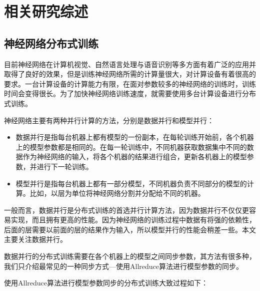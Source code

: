 \chapter{相关研究综述}
\label{chap2}

\section{神经网络分布式训练}
目前神经网络在计算机视觉、自然语言处理与语音识别等多方面有着广泛的应用并取得了良好的效果，但是训练神经网络所需的计算量很大，对计算设备有着很高的要求。一台计算设备的计算能力有限，在面对参数较多的神经网络的训练时，训练时间会变得很长。为了加快神经网络训练速度，就需要使用多台计算设备进行分布式训练。

神经网络主要有两种并行计算的方法，分别是数据并行和模型并行：
\begin{itemize}
    \item 数据并行是指每台机器上都有模型的一份副本，在每轮训练开始前，各个机器上的模型参数都是相同的。在每一轮训练中，不同机器获取数据集中不同的数据作为神经网络的输入，将各个机器的结果进行组合，更新各机器上的模型参数，并进行下一轮训练。
    \item 模型并行是指每台机器上都有一部分模型，不同机器负责不同部分的模型的计算。比如，以层为单位将神经网络分割并分配给不同的机器。
\end{itemize}

一般而言，数据并行是分布式训练的首选并行计算方法，因为数据并行不仅仅更容易实现，而且拥有更高的性能。因为神经网络的训练过程中数据有将强的依赖性，后面的层需要以前面的层的结果作为输入，所以模型并行的性能会稍差一些。本文主要关注数据并行。

数据并行的分布式训练需要在各个机器上的模型之间同步参数，其方法有很多种，我们只介绍最常见的一种同步方式---使用Allreduce算法进行模型参数的同步。

使用Allreduce算法进行模型参数同步的分布式训练大致过程如下：

